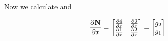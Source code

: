 Now we calculate  and 
\newcommand{\Nx}{\ensuremath{\dx{\mathbf{N}}}}
\newcommand{\Ny}{\ensuremath{\dy{\mathbf{N}}}}

\def\x{
  \ensuremath{\begin{bmatrix} g_2 \\ g_1 \end{bmatrix}}}
\def\y{
  \ensuremath{\begin{bmatrix} f_1 & f_2 \end{bmatrix}}}
\begin{align}
  \Nx &=
        \begin{bmatrix}
          \Nij{4}{x} & \Nij{3}{x} \\
          \Nij{1}{x} & \Nij{2}{x} 
        \end{bmatrix} = \x 
\end{align}
